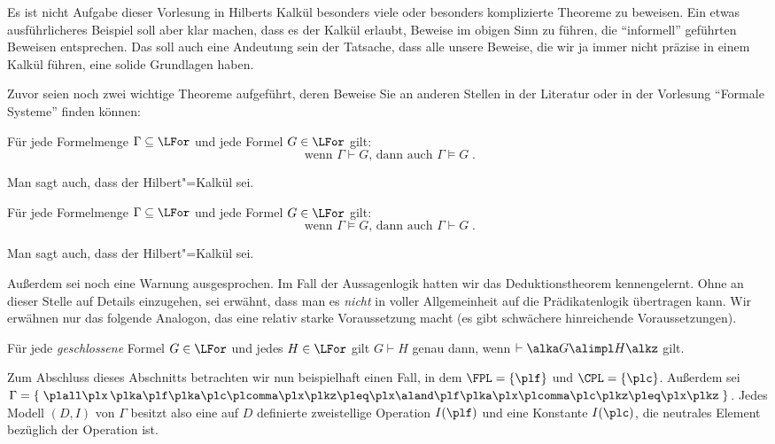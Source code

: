 Es ist nicht Aufgabe dieser Vorlesung in Hilberts Kalkül besonders
viele oder besonders komplizierte Theoreme zu beweisen.
%
Ein etwas ausführlicheres Beispiel soll aber klar machen, dass es der
Kalkül erlaubt, Beweise im obigen Sinn zu führen, die "`informell"'
geführten Beweisen entsprechen.
%
Das soll auch eine Andeutung sein der Tatsache, dass alle unsere
Beweise, die wir ja immer nicht präzise in einem Kalkül führen, eine
solide Grundlagen haben.

Zuvor seien noch zwei wichtige Theoreme aufgeführt, deren Beweise Sie
an anderen Stellen in der Literatur oder \zB in der Vorlesung
"`Formale Systeme"' finden können:

\begin{theorem}
  Für jede Formelmenge $\Gamma\subseteq\LFor$ und jede Formel
  $G\in\LFor$ gilt:
  \[
    \text{ wenn } \Gamma \vdash G \text{, dann auch } \Gamma
    \models G \;.
  \]
\end{theorem}
%
Man sagt auch, dass der Hilbert"=Kalkül  sei.

\begin{theorem}
  Für jede Formelmenge $\Gamma\subseteq\LFor$ und jede Formel
  $G\in\LFor$ gilt:
  \[
    \text{ wenn } \Gamma \models G \text{, dann auch } \Gamma
    \vdash G \;.
  \]
\end{theorem}
%
Man sagt auch, dass der Hilbert"=Kalkül  sei.

Außerdem sei noch eine Warnung ausgesprochen.
%
Im Fall der Aussagenlogik hatten wir das Deduktionstheorem
kennengelernt.
%
Ohne an dieser Stelle auf Details einzugehen, sei erwähnt, dass man es
\emph{nicht} in voller Allgemeinheit auf die Prädikatenlogik
übertragen kann.
%
Wir erwähnen nur das folgende Analogon, das eine relativ starke
Voraussetzung macht (es gibt schwächere hinreichende Voraussetzungen).
\begin{theorem}
  Für jede \emph{geschlossene} Formel $G\in\LFor$ und jedes
  $H\in\LFor$ gilt $G\vdash H$ genau dann, wenn
  $\vdash \alka G\alimpl H\alkz$ gilt.
\end{theorem}
%
Zum Abschluss dieses Abschnitts betrachten wir nun beispielhaft einen
Fall, in dem $\FPL=\{\plf\}$ und $\CPL=\{\plc\}$. Außerdem sei
$\Gamma=\{\;\plall\plx\, \plka\plf\plka\plc\plcomma\plx\plkz \pleq
\plx \aland \plf\plka\plx\plcomma\plc\plkz \pleq\plx\plkz\;\}$.
%
Jedes Modell $(D,I)$ von $\Gamma$ besitzt also eine auf $D$ definierte
zweistellige Operation $I(\plf)$ und eine Konstante $I(\plc)$, die
neutrales Element bezüglich der Operation ist.

